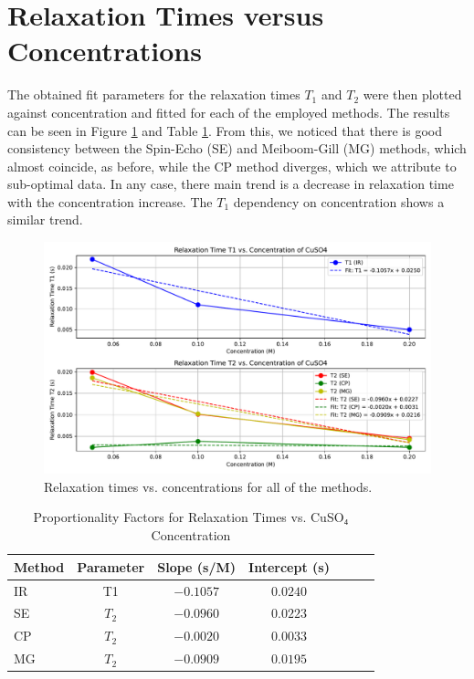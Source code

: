 \documentclass[12pt]{article}
\begin{document}
\section{Relaxation Times versus Concentrations}
The obtained fit parameters for the relaxation times $T_1$ and $T_2$ were then plotted against concentration and fitted for each of the employed methods. The results can be seen in Figure \ref{relaxation_times_vs_concentration.pdf} and Table \ref{tab:prop}. From this, we noticed that there is good consistency between the Spin-Echo (SE) and Meiboom-Gill (MG) methods, which almost coincide, as before, while the CP method diverges, which we attribute to sub-optimal data. In any case, there main trend is a decrease in relaxation time with the concentration increase. The $T_1$ dependency on concentration shows a similar trend.

\begin{figure}[H]
  \includegraphics[scale = 0.6]{relaxation_times_vs_concentration.pdf}
  \caption{Relaxation times vs. concentrations for all of the methods.}
  \label{relaxation_times_vs_concentration.pdf}
\end{figure}

\begin{table}[ht]
\centering
\begin{tabular}{lcccccc}
\toprule
\textbf{Method} & \textbf{Parameter} & \textbf{Slope (s/M)} & \textbf{Intercept (s)} \\
\midrule
IR & T1 & $-0.1057$ & $0.0240$ \\
SE & $T_2$ & $-0.0960$ & $0.0223$ \\
CP & $T_2$ & $-0.0020$ & $0.0033$ \\
MG & $T_2$ & $-0.0909$ & $0.0195$ \\
\bottomrule
\end{tabular}
\caption{Proportionality Factors for Relaxation Times vs. CuSO₄ Concentration}
\label{tab:prop}
\end{table}
\end{document}
